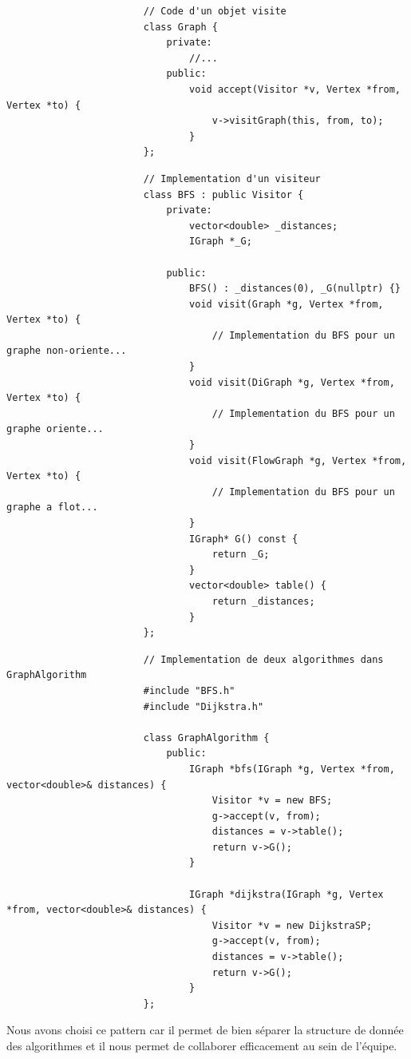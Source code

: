 \documentclass[french]{article}
\begin{document}
			\begin{lstlisting}
						// Code d'un objet visite
						class Graph {
							private:
								//...
							public:
								void accept(Visitor *v, Vertex *from, Vertex *to) {
									v->visitGraph(this, from, to);
								}
						};
			\end{lstlisting}
			\begin{lstlisting}
						// Implementation d'un visiteur
						class BFS : public Visitor {
							private:
								vector<double> _distances;
								IGraph *_G;
								
							public:
								BFS() : _distances(0), _G(nullptr) {}
								void visit(Graph *g, Vertex *from, Vertex *to) {
									// Implementation du BFS pour un graphe non-oriente...
								}
								void visit(DiGraph *g, Vertex *from, Vertex *to) {
									// Implementation du BFS pour un graphe oriente...
								}
								void visit(FlowGraph *g, Vertex *from, Vertex *to) {
									// Implementation du BFS pour un graphe a flot...
								}
								IGraph* G() const {
									return _G;
								}
								vector<double> table() {
									return _distances;
								}
						};
			\end{lstlisting}
			\begin{lstlisting}
						// Implementation de deux algorithmes dans GraphAlgorithm
						#include "BFS.h"
						#include "Dijkstra.h"
						
						class GraphAlgorithm {							
							public:
								IGraph *bfs(IGraph *g, Vertex *from, vector<double>& distances) {
									Visitor *v = new BFS;
									g->accept(v, from);
									distances = v->table();
									return v->G();
								}
								
								IGraph *dijkstra(IGraph *g, Vertex *from, vector<double>& distances) {
									Visitor *v = new DijkstraSP;
									g->accept(v, from);
									distances = v->table();
									return v->G();
								}
						};
			\end{lstlisting}
			
			Nous avons choisi ce pattern car il permet de bien séparer la structure de donnée des algorithmes et il nous permet de collaborer efficacement au sein de l'équipe.
			
\end{document}
